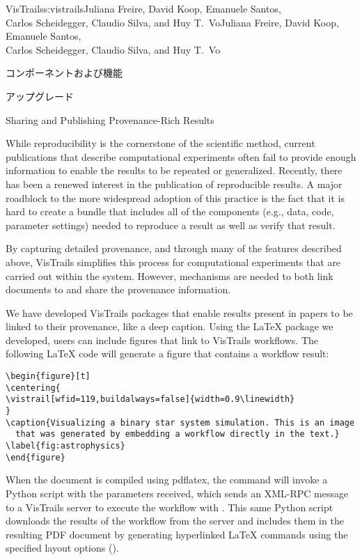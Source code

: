 \begin{aosachaptertoc}{VisTrails}{s:vistrails}{Juliana Freire, David Koop, Emanuele Santos, \\ Carlos Scheidegger, Claudio Silva, and Huy T.\ Vo}{Juliana Freire, David Koop, Emanuele Santos, \\ \hspace*{0.9cm} Carlos Scheidegger, Claudio Silva, and Huy T.\ Vo}
\begin{aosasect1}{コンポーネントおよび機能}
\begin{aosasect2}{アップグレード}
\end{aosasect2}

\begin{aosasect2}{Sharing and Publishing Provenance-Rich Results}
\label{sec.vistrails.publish}

While reproducibility is the cornerstone of the scientific method,
current publications that describe computational experiments 
often fail to provide enough information to enable the results
to be repeated or generalized. Recently, there has been a renewed
interest in the publication of reproducible results. A major roadblock
to the more widespread adoption of this practice is the fact that it
is hard to create a bundle that includes all of the components (e.g.,
data, code, parameter settings) needed to reproduce a result as well
as verify that result.

By capturing detailed provenance, and through many of the features
described above, VisTrails simplifies this process for computational
experiments that are carried out within the system. However,
mechanisms are needed to both link documents to and share the
provenance information.

We have developed VisTrails packages that enable results present in
papers to be linked to their provenance, like a deep caption. Using
the LaTeX package we developed, users can include figures that link to
VisTrails workflows.  The following LaTeX code will generate a figure
that contains a workflow result:

\begin{verbatim}
\begin{figure}[t]
\centering{
\vistrail[wfid=119,buildalways=false]{width=0.9\linewidth}
}
\caption{Visualizing a binary star system simulation. This is an image
  that was generated by embedding a workflow directly in the text.}
\label{fig:astrophysics}
\end{figure}
\end{verbatim}

When the document is compiled using pdflatex, the
 command will invoke a Python script
with the parameters received, which sends an XML-RPC message to a
VisTrails server to execute the workflow with . This same
Python script downloads the results of the workflow from the server
and includes them in the resulting PDF document by generating
hyperlinked LaTeX  commands
using the specified layout options
().


\end{aosasect2}
\end{aosasect1}
\end{aosachaptertoc}
